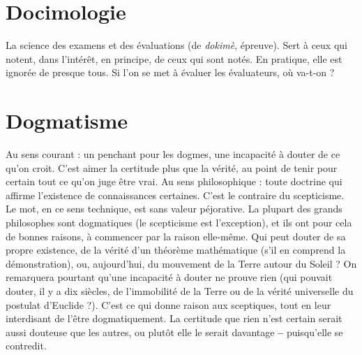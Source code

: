 \section{Docimologie}
La science des examens et des évaluations (de {\it dokimè},
épreuve). Sert à ceux qui notent, dans l'intérêt, en principe,
de ceux qui sont notés. En pratique, elle est ignorée de presque tous. Si
l’on se met à évaluer les évaluateurs, où va-t-on ?

\section{Dogmatisme}
Au sens courant : un penchant pour les dogmes, une incapacité
à douter de ce qu’on croit. C’est aimer la certitude
plus que la vérité, au point de tenir pour certain tout ce qu’on juge être vrai.
Au sens philosophique : toute doctrine qui affirme l'existence de connaissances
certaines. C’est le contraire du scepticisme. Le mot, en ce sens technique,
est sans valeur péjorative. La plupart des grands philosophes sont dogmatiques
(le scepticisme est l’exception), et ils ont pour cela de bonnes raisons,
à commencer par la raison elle-même. Qui peut douter de sa propre existence,
de la vérité d’un théorème mathématique (s’il en comprend la démonstration),
ou, aujourd’hui, du mouvement de la Terre autour du Soleil ? On remarquera
pourtant qu’une incapacité à douter ne prouve rien (qui pouvait douter, il y a
dix siècles, de l’immobilité de la Terre ou de la vérité universelle du postulat
d’Euclide ?). C’est ce qui donne raison aux sceptiques, tout en leur interdisant
de l’être dogmatiquement. La certitude que rien n’est certain serait aussi douteuse
que les autres, ou plutôt elle le serait davantage {\bf --} puisqu'elle se contredit.

